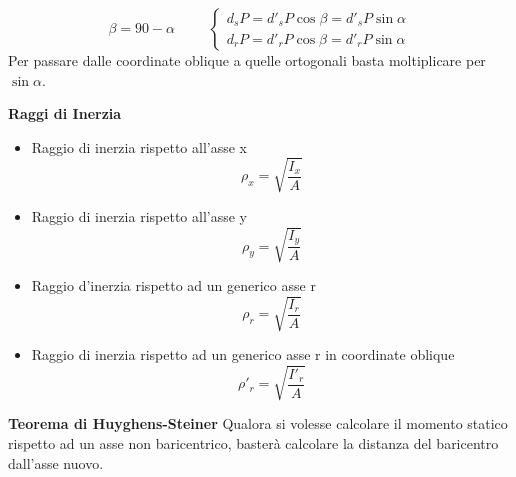 \documentclass{article}
\begin{document}
\begin{adjustwidth}{2in}{}
	\[ \beta = 90 - \alpha \hspace{1cm} \begin{cases}
										d_s P = d'_s P\cos\beta = d'_s P\sin\alpha \\
										d_r P = d'_r P\cos\beta = d'_r P\sin\alpha 
	\end{cases}\]
Per passare dalle coordinate oblique a quelle ortogonali basta moltiplicare per $\sin\alpha$. \newline

\textbf{Raggi di Inerzia} \newline
	\begin{itemize}
		\item Raggio di inerzia rispetto all’asse x
				\[ \rho_x = \sqrt{\dfrac{I_x}{A}}\]
		\item Raggio di inerzia rispetto all’asse y
				\[ \rho_y = \sqrt{\dfrac{I_y}{A}}\]	
		\item Raggio d'inerzia rispetto ad un generico asse r
				\[ \rho_r = \sqrt{\dfrac{I_r}{A}}\]	
		\item Raggio di inerzia rispetto ad un generico asse r in coordinate oblique
				\[ \rho'_r = \sqrt{\dfrac{I'_r}{A}}\]	
	\end{itemize}
\newpage
\textbf{Teorema di Huyghens-Steiner} \newline
	Qualora si volesse calcolare il momento statico rispetto ad un asse non baricentrico, basterà calcolare la distanza del baricentro dall'asse nuovo. \newline 
	

\end{adjustwidth}
\end{document}
